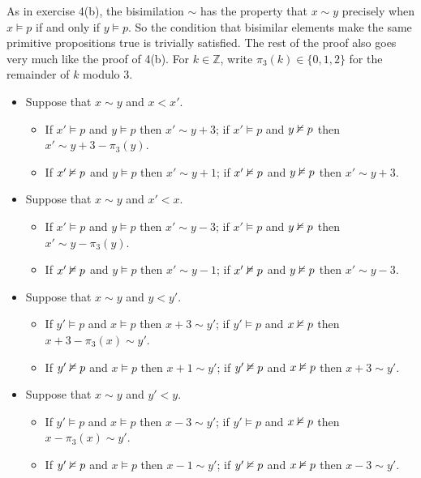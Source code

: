 \documentclass{article}
\begin{document}
\begin{ex}
As in exercise 4(b), the bisimilation $\sim$ has the property that $x\sim y$ precisely when $x\models p$ if and only if $y\models p$. So the condition that bisimilar elements make the same primitive propositions true is trivially satisfied. The rest of the proof also goes very much like the proof of 4(b). For $k\in\mathbb{Z}$, write $\pi_3(k)\in\{0,1,2\}$ for the remainder of $k$ modulo $3$.
\begin{itemize}
\item Suppose that $x\sim y$ and $x<x'$. 
\begin{itemize}
\item If $x'\models p$ and $y\models p$ then $x'\sim y+3$; if $x'\models p$ and $y\nvDash p$ then $x'\sim y+3-\pi_3(y)$.
\item If $x'\nvDash p$ and $y\models p$ then $x'\sim y+1$; if $x'\nvDash p$ and $y\nvDash p$ then $x'\sim y+3$.
\end{itemize}
\item Suppose that $x\sim y$ and $x'<x$.
\begin{itemize}
\item If $x'\models p$ and $y\models p$ then $x'\sim y-3$; if $x'\models p$ and $y\nvDash p$ then $x'\sim y-\pi_3(y)$.
\item If $x'\nvDash p$ and $y\models p$ then $x'\sim y-1$; if $x'\nvDash p$ and $y\nvDash p$ then $x'\sim y-3$.
\end{itemize}
\item Suppose that $x\sim y$ and $y<y'$.
\begin{itemize}
\item If $y'\models p$ and $x\models p$ then $x+3\sim y'$; if $y'\models p$ and $x\nvDash p$ then $x+3-\pi_3(x)\sim y'$.
\item If $y'\nvDash p$ and $x\models p$ then $x+1\sim y'$; if $y'\nvDash p$ and $x\nvDash p$ then $x+3\sim y'$.
\end{itemize}
\item Suppose that $x\sim y$ and $y'<y$.
\begin{itemize}
\item If $y'\models p$ and $x\models p$ then $x-3\sim y'$; if $y'\models p$ and $x\nvDash p$ then $x-\pi_3(x)\sim y'$.
\item If $y'\nvDash p$ and $x\models p$ then $x-1\sim y'$; if $y'\nvDash p$ and $x\nvDash p$ then $x-3\sim y'$.
\end{itemize}
\end{itemize}
\end{ex}
\end{document}

